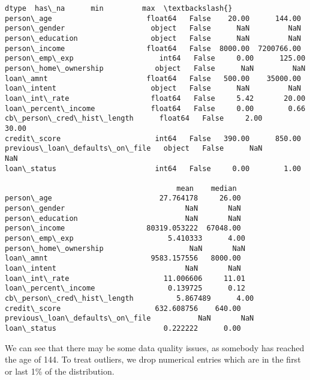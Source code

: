\documentclass[11pt]{article}
\makeatletter
\newcommand{\boxspacing}{\kern\kvtcb@left@rule\kern\kvtcb@boxsep}
\newcommand{\prompt}[4]{
        {\ttfamily\llap{{\color{#2}[#3]:\hspace{3pt}#4}}\vspace{-\baselineskip}}
    }
\makeatother
\begin{document}
            \begin{tcolorbox}[breakable, size=fbox, boxrule=.5pt, pad at break*=1mm, opacityfill=0]
\prompt{Out}{outcolor}{3}{\boxspacing}
\begin{Verbatim}[commandchars=\\\{\}]
                                  dtype  has\_na      min         max  \textbackslash{}
person\_age                      float64   False    20.00      144.00
person\_gender                    object   False      NaN         NaN
person\_education                 object   False      NaN         NaN
person\_income                   float64   False  8000.00  7200766.00
person\_emp\_exp                    int64   False     0.00      125.00
person\_home\_ownership            object   False      NaN         NaN
loan\_amnt                       float64   False   500.00    35000.00
loan\_intent                      object   False      NaN         NaN
loan\_int\_rate                   float64   False     5.42       20.00
loan\_percent\_income             float64   False     0.00        0.66
cb\_person\_cred\_hist\_length      float64   False     2.00       30.00
credit\_score                      int64   False   390.00      850.00
previous\_loan\_defaults\_on\_file   object   False      NaN         NaN
loan\_status                       int64   False     0.00        1.00

                                        mean    median
person\_age                         27.764178     26.00
person\_gender                            NaN       NaN
person\_education                         NaN       NaN
person\_income                   80319.053222  67048.00
person\_emp\_exp                      5.410333      4.00
person\_home\_ownership                    NaN       NaN
loan\_amnt                        9583.157556   8000.00
loan\_intent                              NaN       NaN
loan\_int\_rate                      11.006606     11.01
loan\_percent\_income                 0.139725      0.12
cb\_person\_cred\_hist\_length          5.867489      4.00
credit\_score                      632.608756    640.00
previous\_loan\_defaults\_on\_file           NaN       NaN
loan\_status                         0.222222      0.00
\end{Verbatim}
\end{tcolorbox}
        
    We can see that there may be some data quality issues, as somebody has
reached the age of 144. To treat outliers, we drop numerical entries
which are in the first or last 1\% of the distribution.
\end{document}
